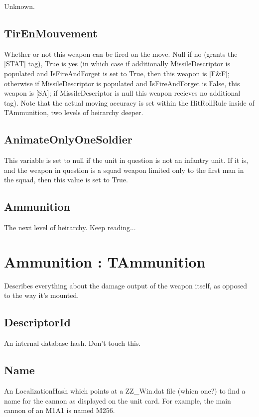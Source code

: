\documentclass{article}
\begin{document}
Unknown.

\subsection{TirEnMouvement}

Whether or not this weapon can be fired on the move. Null if no (grants the [STAT] tag), True is yes (in which case if additionally MissileDescriptor is populated and IsFireAndForget is set to True, then this weapon is [F\&F]; otherwise if MissileDescriptor is populated and IsFireAndForget is False, this weapon is [SA]; if MissileDescriptor is null this weapon recieves no additional tag). Note that the actual moving accuracy is set within the HitRollRule inside of TAmmunition, two levels of heirarchy deeper.

\subsection{AnimateOnlyOneSoldier}

This variable is set to null if the unit in question is not an infantry unit. If it is, and the weapon in question is a squad weapon limited only to the first man in the squad, then this value is set to True.

\subsection{Ammunition}

The next level of heirarchy. Keep reading...

\section{Ammunition : TAmmunition}

Describes everything about the damage output of the weapon itself, as opposed to the way it's mounted.

\subsection{DescriptorId}

An internal database hash. Don't touch this.

\subsection{Name}

An LocalizationHash which points at a ZZ\_Win.dat file (whicn one?)  to find a name for the cannon as displayed on the unit card. For example, the main cannon of an M1A1 is named M256.
\end{document}
